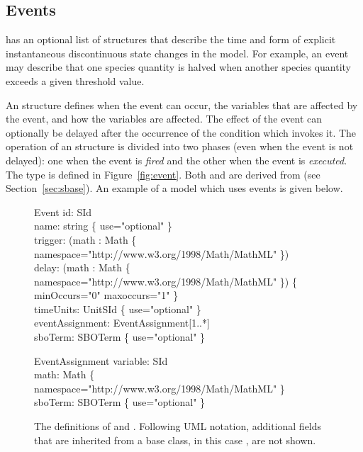 \subsection{Events}
\label{sec:events}

\Model has an optional list of \Event structures that describe the
time and form of explicit instantaneous discontinuous state
changes in the model.  For example, an event may describe that one
species quantity is halved when another species quantity exceeds a
given threshold value.

An \Event structure defines when the event can occur, the
variables that are affected by the event, and how the variables
are affected.  The effect of the event can optionally be delayed
after the occurrence of the condition which invokes it.  The
operation of an \Event structure is divided into two phases (even
when the event is not delayed): one when the event is \emph{fired}
and the other when the event is \emph{executed}. The \Event type
is defined in Figure~\vref{fig:event}.  Both \Event and
\EventAssignment are derived from \SBase (see
Section~\ref{sec:sbase}).  An example of a model which uses events
is given below.

\begin{figure}[htb]
  \centering
  \begin{classbox}{Event}
    id: SId                                                                     \\
    name: string \{ use="optional" \}                                           \\
    trigger: (math : Math \{ namespace="http://www.w3.org/1998/Math/MathML" \}) \\
    delay: (math : Math \{ namespace="http://www.w3.org/1998/Math/MathML" \}) \{ minOccurs="0" maxoccurs="1" \} \\
    timeUnits: UnitSId \{ use="optional" \}                       \\
    eventAssignment: EventAssignment[1..*]                                      \\
    sboTerm: SBOTerm \{ use="optional" \}                         \\
  \end{classbox}
  \vspace*{2ex}
  \begin{classbox}{EventAssignment}
    variable: SId                                                              \\
    math: Math \{ namespace="http://www.w3.org/1998/Math/MathML" \}            \\
    sboTerm: SBOTerm \{ use="optional" \}                        \\
  \end{classbox}
  \caption{The definitions of \Event and \EventAssignment.
    Following UML notation, additional fields that are inherited
    from a base class, in this case \SBase, are not shown.}
  \label{fig:event}
\end{figure}


